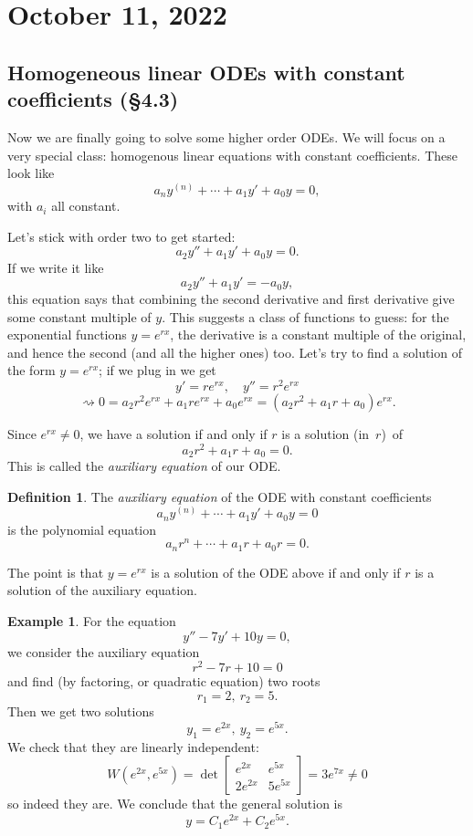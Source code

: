 \documentclass[12pt]{amsart}
\numberwithin{equation}{section}
\theoremstyle{plain} %
\newcommand{\Oct}[1]{\section{October #1, 2022}}
\newcommand{\rsa}{\rightsquigarrow}
\theoremstyle{definition}
\newtheorem{defn}[equation]{Definition}
\newtheorem{ex}[equation]{Example}
\theoremstyle{remark}
\begin{document}
\Oct{11}

\subsection*{Homogeneous linear ODEs with constant coefficients (\S4.3)}

Now we are finally going to solve some higher order ODEs. We will focus on a very special class: homogenous linear equations with constant coefficients. These look like
\[ a_n y^{(n)} + \cdots  + a_1 y' + a_0 y = 0,\]
with $a_i$ all constant. 

Let's stick with order two to get started:
\[ a_2 y'' + a_1 y' + a_0 y = 0.\]
If we write it like
\[ a_2 y'' + a_1 y' = -a_0 y,\]
this equation says that combining the second derivative and first derivative give some constant multiple of $y$. This suggests a class of functions to guess: for the exponential functions $y=e^{rx}$, the derivative is a constant multiple of the original, and hence the second (and all the higher ones) too. Let's try to find a solution of the form $y=e^{rx}$; if we plug in we get
\[ y' = r e^{rx}, \quad y'' = r^2 e^{rx}\]
\[\rsa 0 = a_2 r^2 e^{rx}  +a_1 r e^{rx} + a_0 e^{rx} = (a_2 r^2 + a_1 r + a_0) e^{rx}.\]

Since $e^{rx}\neq 0$, we have a solution if and only if $r$ is a solution (in~$r$)~of 
\[a_2 r^2 + a_1 r + a_0 =0.\] This is called the \emph{auxiliary equation} of our ODE.

\begin{defn}
The \emph{auxiliary equation} of the ODE with constant coefficients
 \[ a_n y^{(n)} + \cdots  + a_1 y' + a_0 y = 0\]
 is the polynomial equation
  \[ a_n r^n + \cdots  + a_1 r + a_0 r = 0.\]
\end{defn}

The point is that $y=e^{rx}$ is a solution of the ODE above if and only if $r$ is a solution of the auxiliary equation.

\begin{ex} For the equation
\[ y'' - 7y' + 10y = 0,\]
we consider the auxiliary equation
\[ r^2 - 7r + 10=0\]
and find (by factoring, or quadratic equation) two roots
\[ r_1 = 2, \ r_2 = 5.\]
Then we get two solutions 
\[ y_1 = e^{2x} , \ y_2= e^{5x}.\]
We check that they are linearly independent:
\[ W(e^{2x},e^{5x}) = \det \begin{bmatrix} e^{2x} & e^{5x} \\ 2 e^{2x} & 5 e^{5x} \end{bmatrix} = 3 e^{7x}\neq 0\]
so indeed they are. We conclude that the general solution is
\[ y= C_1 e^{2x} + C_2 e^{5x}.\]
\end{ex}
\end{document}
